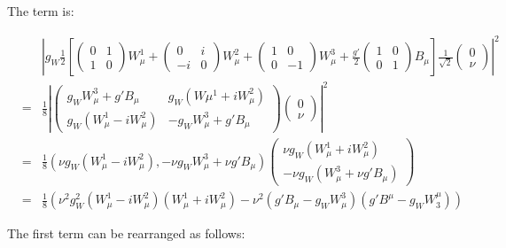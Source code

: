 The term is:

\begin{eqnarray*}
  & &
  \left| g_W \frac{1}{2}\left[
  \left(
  \begin{array}{cc}
    0 & 1 \\
    1 & 0
  \end{array}
  \right)
  W_{\mu}^1 +
  \left(
  \begin{array}{cc}
    0  & i \\
    -i & 0
  \end{array}
  \right)
  W_{\mu}^2 +
  \left(
  \begin{array}{cc}
    1 & 0 \\
    0 & -1
  \end{array}
  \right)
  W_{\mu}^3
  + \frac{g'}{2}
  \left(
  \begin{array}{cc}
    1 & 0 \\
    0 & 1
  \end{array}
  \right)
  B_{\mu}
  \right]
  \frac{1}{\sqrt{2}}
  \left(
  \begin{array}{c}
    0 \\
    \nu
  \end{array}
  \right)
  \right|^2
  \\
  & = & \frac{1}{8}\left|
  \left(
  \begin{array}{cc}
    g_W W_{\mu}^3 + g'B_{\mu} & g_W\left(W{\mu}^1 + iW_{\mu}^2\right) \\
    g_W \left(W_{\mu}^1 - iW_{\mu}^2\right) & -g_W W_{\mu}^3 + g'B_{\mu}
  \end{array}
  \right)
  \left(
  \begin{array}{c}
    0 \\
    \nu
  \end{array}
  \right)
  \right|^2
  \\
  & = & \frac{1}{8}\left(\nu g_W\left(W_{\mu}^1 - iW_{\mu}^2\right) , -\nu g_W W_{\mu}^3 + \nu g'B_{\mu}\right)
  \left(
  \begin{array}{c}
    \nu g_W\left(W_{\mu}^1 + iW_{\mu}^2\right) \\
    -\nu g_W\left(W_{\mu}^3 + \nu g'B_{\mu}\right)
  \end{array}
  \right)
  \\
  & = &
  \frac{1}{8}\left( \nu^2g_W^2\left(W_{\mu}^1 - iW_{\mu}^2\right)\left(W_{\mu}^1 + iW_{\mu}^2\right) - \nu^2\left(g'B_{\mu} - g_W W_{\mu}^3\right)\left(g' B^{\mu} - g_W W^{\mu}_3\right)\right)
\end{eqnarray*}

The first term can be rearranged as follows:

